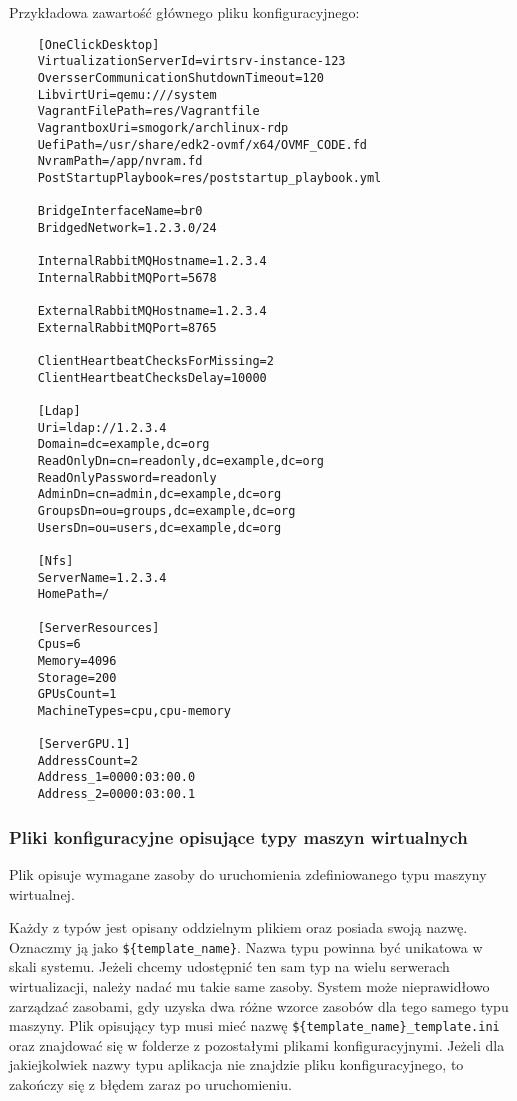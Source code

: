 \documentclass[../opis-rozwiazania.tex]{subfiles}
\begin{document}
Przykładowa zawartość głównego pliku konfiguracyjnego:
\begin{verbatim}
	[OneClickDesktop]
	VirtualizationServerId=virtsrv-instance-123
	OversserCommunicationShutdownTimeout=120
	LibvirtUri=qemu:///system
	VagrantFilePath=res/Vagrantfile
	VagrantboxUri=smogork/archlinux-rdp
	UefiPath=/usr/share/edk2-ovmf/x64/OVMF_CODE.fd
	NvramPath=/app/nvram.fd
	PostStartupPlaybook=res/poststartup_playbook.yml

	BridgeInterfaceName=br0
	BridgedNetwork=1.2.3.0/24

	InternalRabbitMQHostname=1.2.3.4
	InternalRabbitMQPort=5678

	ExternalRabbitMQHostname=1.2.3.4
	ExternalRabbitMQPort=8765

	ClientHeartbeatChecksForMissing=2
	ClientHeartbeatChecksDelay=10000

	[Ldap]
	Uri=ldap://1.2.3.4
	Domain=dc=example,dc=org
	ReadOnlyDn=cn=readonly,dc=example,dc=org
	ReadOnlyPassword=readonly
	AdminDn=cn=admin,dc=example,dc=org
	GroupsDn=ou=groups,dc=example,dc=org
	UsersDn=ou=users,dc=example,dc=org

	[Nfs]
	ServerName=1.2.3.4
	HomePath=/

	[ServerResources]
	Cpus=6
	Memory=4096
	Storage=200
	GPUsCount=1
	MachineTypes=cpu,cpu-memory

	[ServerGPU.1]
	AddressCount=2
	Address_1=0000:03:00.0
	Address_2=0000:03:00.1
\end{verbatim}

\subsubsection{Pliki konfiguracyjne opisujące typy maszyn wirtualnych}
Plik opisuje wymagane zasoby do uruchomienia zdefiniowanego typu maszyny wirtualnej.

Każdy z typów jest opisany oddzielnym plikiem oraz posiada swoją nazwę.
Oznaczmy ją jako \texttt{\$\{template\_name\}}.
Nazwa typu powinna być unikatowa w skali systemu.
Jeżeli chcemy udostępnić ten sam typ na wielu serwerach wirtualizacji, należy nadać mu takie same zasoby.
System może nieprawidłowo zarządzać zasobami, gdy uzyska dwa różne wzorce zasobów dla tego samego typu maszyny.
Plik opisujący typ musi mieć nazwę \texttt{\$\{template\_name\}\_template.ini} oraz znajdować się w folderze z pozostałymi plikami konfiguracyjnymi.
Jeżeli dla jakiejkolwiek nazwy typu aplikacja nie znajdzie pliku konfiguracyjnego, to zakończy się z błędem zaraz po uruchomieniu.
\end{document}
